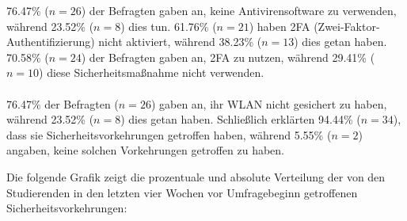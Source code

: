 \documentclass[german,report]{i1thesis}
\begin{document}
76.47\% (\(n = 26\)) der Befragten gaben an, keine Antivirensoftware zu verwenden, während 23.52\% (\(n = 8\)) dies tun. 61.76\% (\(n = 21\)) haben 2FA (Zwei-Faktor-Authentifizierung) nicht aktiviert, während 38.23\% (\(n = 13\)) dies getan haben. 70.58\% (\(n = 24\)) der Befragten gaben an, 2FA zu nutzen, während 29.41\% (\(n = 10\)) diese Sicherheitsmaßnahme nicht verwenden.\\
\\
76.47\% der Befragten (\(n = 26\)) gaben an, ihr WLAN nicht gesichert zu haben, während 23.52\% (\(n = 8\)) dies getan haben. Schließlich erklärten 94.44\% (\(n = 34\)), dass sie Sicherheitsvorkehrungen getroffen haben, während 5.55\% (\(n = 2\)) angaben, keine solchen Vorkehrungen getroffen zu haben.

Die folgende Grafik zeigt die prozentuale und absolute Verteilung der von den Studierenden in den letzten vier Wochen vor Umfragebeginn getroffenen Sicherheitsvorkehrungen:
\end{document}

